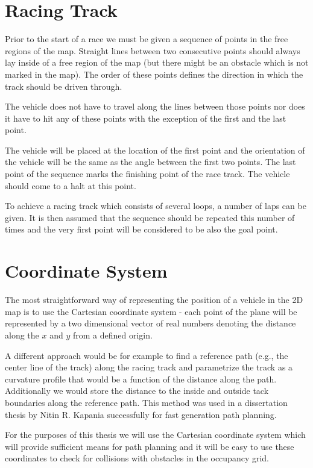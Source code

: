\section{Racing Track}

Prior to the start of a race we must be given a sequence of points in the free regions of the map. Straight lines between two consecutive points should always lay inside of a free region of the map (but there might be an obstacle which is not marked in the map). The order of these points defines the direction in which the track should be driven through.

The vehicle does not have to travel along the lines between those points nor does it have to hit any of these points with the exception of the first and the last point.

The vehicle will be placed at the location of the first point and the orientation of the vehicle will be the same as the angle between the first two points. The last point of the sequence marks the finishing point of the race track. The vehicle should come to a halt at this point.

To achieve a racing track which consists of several loops, a number of laps can be given. It is then assumed that the sequence should be repeated this number of times and the very first point will be considered to be also the goal point.

\section{Coordinate System}

The most straightforward way of representing the position of a vehicle in the 2D map is to use the Cartesian coordinate system - each point of the plane will be represented by a two dimensional vector of real numbers denoting the distance along the $x$ and $y$ from a defined origin.

A different approach would be for example to find a reference path (e.g., the center line of the track) along the racing track and parametrize the track as a curvature profile that would be a function of the distance along the path. Additionally we would store the distance to the inside and outside tack boundaries along the reference path. This method was used in a dissertation thesis by Nitin R. Kapania \cite{dissertation} successfully for fast generation path planning.

For the purposes of this thesis we will use the Cartesian coordinate system which will provide sufficient means for path planning and it will be easy to use these coordinates to check for collisions with obstacles in the occupancy grid.

